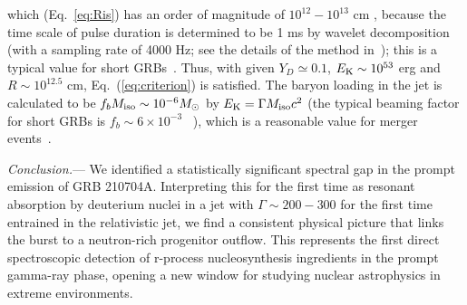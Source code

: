 \documentclass[linenumbers,twocolumn]{aastex631}
\providecommand{\DIFaddtex}[1]{{\protect\color{blue} \sf #1}} %
\providecommand{\DIFdeltex}[1]{{\protect\color{red} \scriptsize #1}} %
\providecommand{\DIFaddbegin}{} %
\providecommand{\DIFaddend}{} %
\providecommand{\DIFdelbegin}{} %
\providecommand{\DIFdelend}{} %
\providecommand{\DIFadd}[1]{\texorpdfstring{\DIFaddtex{#1}}{#1}} %
\providecommand{\DIFdel}[1]{\texorpdfstring{\DIFdeltex{#1}}{}} %
\begin{document}
\DIFdel{which }\DIFdelend \DIFaddbegin \DIFadd{(Eq.~\ref{eq:Ris}) }\DIFaddend has an order of magnitude of $10^{12}-10^{13}$ cm\DIFdelbegin \DIFdel{, because the time scale of pulse duration is determined to be 1 ms by wavelet decomposition (with a sampling rate of 4000 Hz; see the details of the method in~\cite{2013MNRAS.432..857M}); this is a typical value for short GRBs~\citep{2014ARA&A..52...43B}}\DIFdelend . Thus, \DIFdelbegin \DIFdel{with }\DIFdelend given $Y_{D}\simeq0.1$, $E_{\rm K}\sim10^{53}$ erg and $R\sim10^{12.5}$ cm, \DIFaddbegin \DIFadd{Eq.~}\DIFaddend (\ref{eq:criterion}) is satisfied. The baryon loading in the jet is calculated to be $f_{b}M_{\rm iso}\sim10^{-6}M_{\odot}$ by $E_{\rm K}=\Gamma M_{\rm iso}c^2$ (the typical beaming factor for short GRBs is $f_b\sim6\times10^{-3}$~\citep[][]{2014ARA&A..52...43B}\DIFaddbegin \DIFadd{)}\DIFaddend , which is a reasonable value for merger events~\citep{2019LRR....23....1M,2025PhRvD.111f3040S}.



\textit{Conclusion.}---
We identified a statistically significant spectral gap in the prompt emission of GRB 210704A. Interpreting this \DIFaddbegin \DIFadd{for the first time }\DIFaddend as resonant absorption by deuterium nuclei \DIFdelbegin \DIFdel{in a jet with $\Gamma \sim 200-300$ for the first time}\DIFdelend \DIFaddbegin \DIFadd{entrained in the relativistic jet}\DIFaddend , we find a consistent physical picture that links the burst to a neutron-rich \DIFdelbegin \DIFdel{progenitor}\DIFdelend \DIFaddbegin \DIFadd{outflow}\DIFaddend . This represents the first direct spectroscopic detection of r-process nucleosynthesis ingredients in the prompt gamma-ray phase, opening a new window for studying nuclear astrophysics in extreme environments.
\end{document}
